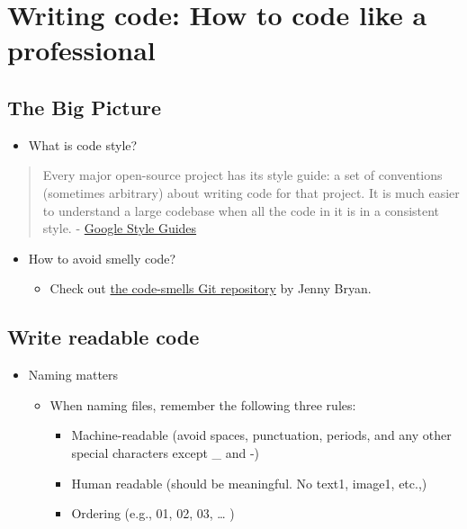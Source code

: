 \documentclass[
]{book}
\providecommand{\tightlist}{%
  \setlength{\itemsep}{0pt}\setlength{\parskip}{0pt}}
\begin{document}
\section{Writing code: How to code like a professional}\label{writing-code-how-to-code-like-a-professional}

\subsection{The Big Picture}\label{the-big-picture-4}

\begin{itemize}
\tightlist
\item
  What is code style?
\end{itemize}

\begin{quote}
Every major open-source project has its style guide: a set of conventions (sometimes arbitrary) about writing code for that project. It is much easier to understand a large codebase when all the code in it is in a consistent style. - \href{https://google.GitHub.io/styleguide/}{Google Style Guides}
\end{quote}

\begin{itemize}
\item
  How to avoid smelly code?

  \begin{itemize}
  \tightlist
  \item
    Check out \href{https://GitHub.com/jennybc/code-smells-and-feels\#readme}{the code-smells Git repository} by Jenny Bryan.
  \end{itemize}
\end{itemize}

\subsection{Write readable code}\label{write-readable-code}

\begin{itemize}
\item
  Naming matters

  \begin{itemize}
  \tightlist
  \item
    When naming files, remember the following three rules:

    \begin{itemize}
    \tightlist
    \item
      Machine-readable (avoid spaces, punctuation, periods, and any other special characters except \_ and -)
    \item
      Human readable (should be meaningful. No text1, image1, etc.,)
    \item
      Ordering (e.g., 01, 02, 03, \ldots{} )
    \end{itemize}
  \end{itemize}
\end{itemize}
\end{document}
